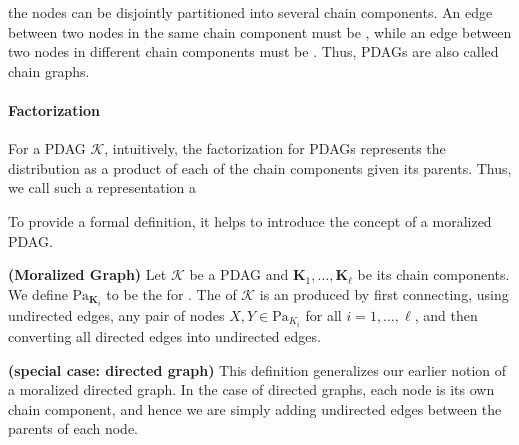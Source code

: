 \documentclass{article}
\newcommand{\bfs}[1]{\textbf{({#1}) }}
\begin{document}
  the nodes can be disjointly partitioned into several chain components. An edge between two nodes in the same chain component must be , while an edge between two nodes in different chain components must be . Thus, PDAGs are also called chain graphs.
\paragraph{Factorization}
For a PDAG $\mathcal{K}$, intuitively, the factorization for PDAGs represents the distribution as a product of each of the chain components given its parents. Thus, we call such a representation a 


To provide a formal definition, it helps to introduce the concept of a moralized PDAG.
\begin{defa}\bfs{Moralized Graph}
Let $\mathcal{K}$ be a PDAG and $\boldsymbol{K}_{1}, \ldots, \boldsymbol{K}_{\ell}$ be its chain components. We define $\mathrm{Pa}_{\boldsymbol{K}_{i}}$ to be the  for . The  of $\mathcal{K}$ is an  produced by first connecting, using undirected edges, any pair of nodes $X, Y \in \mathrm{Pa}_{K_{i}}$ for all $i=1, \ldots, \ell$, and then converting all directed edges into undirected edges.
\end{defa}
\begin{rema}\bfs{special case: directed graph}
 This definition generalizes our earlier notion of a moralized directed graph. In the case of directed graphs, each node is its own chain component, and hence we are simply adding undirected edges between the parents of each node.
\end{rema}
\end{document}
